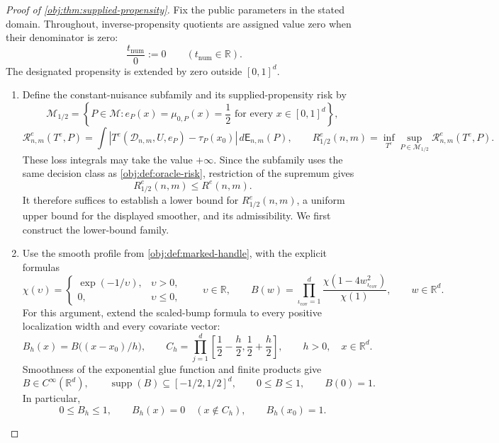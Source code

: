 \documentclass[11pt]{article}
\begin{document}
\begin{proof}[Proof of \cref{obj:thm:supplied-propensity}]
Fix the public parameters in the stated domain. Throughout, inverse-propensity quotients are assigned value zero when their denominator is zero:
\[
\frac{t_{\mathrm{num}}}{0}:=0
\qquad(t_{\mathrm{num}}\in\mathbb R).
\]
The designated propensity is extended by zero outside \([0,1]^d\).

\begin{enumerate}
\item Define the constant-nuisance subfamily and its supplied-propensity risk by
\[
\mathcal M_{1/2}
=
\left\{
P\in\mathcal M:
e_P(x)=\mu_{0,P}(x)=\frac12
\text{ for every }x\in[0,1]^d
\right\},
\]
\[
\mathcal R^e_{n,m}(T^e,P)
=
\int
\left|T^e(\mathcal D_{n,m},U,e_P)-\tau_P(x_0)\right|
\,d\mathsf E_{n,m}(P),
\qquad
R^e_{1/2}(n,m)
=
\inf_{T^e}\sup_{P\in\mathcal M_{1/2}}
\mathcal R^e_{n,m}(T^e,P).
\]
These loss integrals may take the value \(+\infty\). Since the subfamily uses the same decision class as \cref{obj:def:oracle-risk}, restriction of the supremum gives
\[
R^e_{1/2}(n,m)\le R^e(n,m).
\]
It therefore suffices to establish a lower bound for \(R^e_{1/2}(n,m)\), a uniform upper bound for the displayed smoother, and its admissibility. We first construct the lower-bound family.

\item Use the smooth profile from \cref{obj:def:marked-handle}, with the explicit formulas
\[
\chi(\upsilon)=
\begin{cases}
\exp(-1/\upsilon),&\upsilon>0,\\
0,&\upsilon\le0,
\end{cases}
\qquad \upsilon\in\mathbb R,
\qquad
B(w)=\prod_{\iota_{\mathrm{cov}}=1}^d\frac{\chi(1-4w_{\iota_{\mathrm{cov}}}^2)}{\chi(1)},
\qquad w\in\mathbb R^d.
\]
For this argument, extend the scaled-bump formula to every positive localization width and every covariate vector:
\[
B_h(x)=B\bigl((x-x_0)/h\bigr),
\qquad
C_h=\prod_{j=1}^d
\left[\frac12-\frac h2,\frac12+\frac h2\right],
\qquad h>0,\quad x\in\mathbb R^d.
\]
Smoothness of the exponential glue function and finite products give
\[
B\in C^\infty(\mathbb R^d),
\qquad
\operatorname{supp}(B)\subseteq[-1/2,1/2]^d,
\qquad
0\le B\le1,
\qquad
B(0)=1.
\]
In particular,
\[
0\le B_h\le1,\qquad
B_h(x)=0\quad(x\notin C_h),\qquad
B_h(x_0)=1.
\]


\end{enumerate}
\end{proof}
\end{document}
